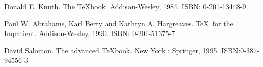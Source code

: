 \begin{enumerate}[{$[$}1{$]$}]
\item Donald E. Knuth. The \TeX book. Addison-Wesley, 1984. ISBN: 0-201-13448-9
\item Paul W. Abrahams, Karl Berry and Kathryn A. Hargreaves. \TeX\ for the
  Impatient. Addison-Wesley, 1990. ISBN: 0-201-51375-7
\item David Salomon. The advanced \TeX book.  New York : Springer, 1995. ISBN:0-387-94556-3
\end{enumerate}
